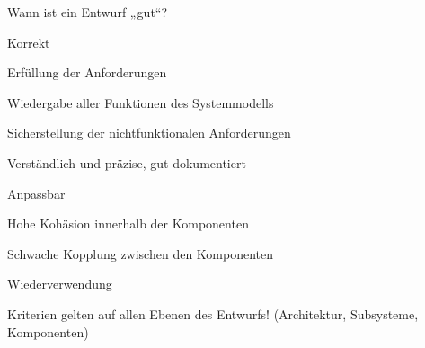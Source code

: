 \documentclass[a4paper]{article}
\begin{document}
\begin{multicols}{3}
  Wann ist ein Entwurf „gut“?
  \begin{itemize*}
    \item Korrekt
    \begin{itemize*}
      \item Erfüllung der Anforderungen
      \item Wiedergabe aller Funktionen des Systemmodells
      \item Sicherstellung der nichtfunktionalen Anforderungen
    \end{itemize*}
    \item Verständlich und präzise, gut dokumentiert
    \item Anpassbar
    \item Hohe Kohäsion innerhalb der Komponenten
    \item Schwache Kopplung zwischen den Komponenten
    \item Wiederverwendung
    \item Kriterien gelten auf allen Ebenen des Entwurfs! (Architektur, Subsysteme, Komponenten)
  \end{itemize*}


\end{multicols}
\end{document}
